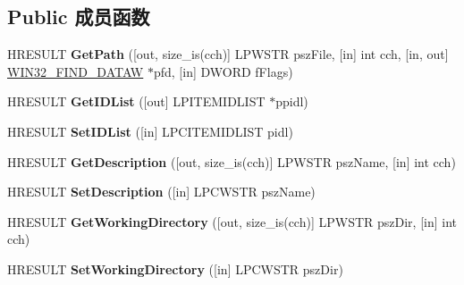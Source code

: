 \subsection*{Public 成员函数}
\begin{DoxyCompactItemize}
\item 
\mbox{\label{interface_i_shell_link_w_adbdb75a714d0a22dc81bf1f48f3f1518}} 
H\+R\+E\+S\+U\+LT {\bfseries Get\+Path} (\mbox{[}out, size\+\_\+is(cch)\mbox{]} L\+P\+W\+S\+TR psz\+File, \mbox{[}in\mbox{]} int cch, \mbox{[}in, out\mbox{]} \hyperlink{struct_w_i_n32___f_i_n_d___d_a_t_a_a}{W\+I\+N32\+\_\+\+F\+I\+N\+D\+\_\+\+D\+A\+T\+AW} $\ast$pfd, \mbox{[}in\mbox{]} D\+W\+O\+RD f\+Flags)
\item 
\mbox{\label{interface_i_shell_link_w_aeb172e3ead1c7468e5bed30ce9d0bb48}} 
H\+R\+E\+S\+U\+LT {\bfseries Get\+I\+D\+List} (\mbox{[}out\mbox{]} L\+P\+I\+T\+E\+M\+I\+D\+L\+I\+ST $\ast$ppidl)
\item 
\mbox{\label{interface_i_shell_link_w_a2c2eaa6c680113a2cd809a0e70a5de9f}} 
H\+R\+E\+S\+U\+LT {\bfseries Set\+I\+D\+List} (\mbox{[}in\mbox{]} L\+P\+C\+I\+T\+E\+M\+I\+D\+L\+I\+ST pidl)
\item 
\mbox{\label{interface_i_shell_link_w_adbc16f8102b7a5b279bf65d8e757f8f0}} 
H\+R\+E\+S\+U\+LT {\bfseries Get\+Description} (\mbox{[}out, size\+\_\+is(cch)\mbox{]} L\+P\+W\+S\+TR psz\+Name, \mbox{[}in\mbox{]} int cch)
\item 
\mbox{\label{interface_i_shell_link_w_ad2aab686af9e2b062bfd452f28cb4646}} 
H\+R\+E\+S\+U\+LT {\bfseries Set\+Description} (\mbox{[}in\mbox{]} L\+P\+C\+W\+S\+TR psz\+Name)
\item 
\mbox{\label{interface_i_shell_link_w_af866b66107f7de09e4e48c1223b91bb0}} 
H\+R\+E\+S\+U\+LT {\bfseries Get\+Working\+Directory} (\mbox{[}out, size\+\_\+is(cch)\mbox{]} L\+P\+W\+S\+TR psz\+Dir, \mbox{[}in\mbox{]} int cch)
\item 
\mbox{\label{interface_i_shell_link_w_adc012ae96b892ca2a280065077870dd8}} 
H\+R\+E\+S\+U\+LT {\bfseries Set\+Working\+Directory} (\mbox{[}in\mbox{]} L\+P\+C\+W\+S\+TR psz\+Dir)

\end{DoxyCompactItemize}
